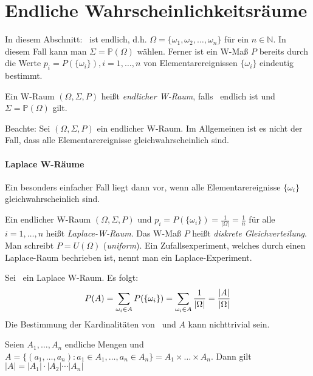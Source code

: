 \section{Endliche Wahrscheinlichkeitsräume}
In diesem Abschnitt: \tO\ ist endlich, d.h. $\Omega = \{\omega_1, \omega_2, \dots, \omega_n\}$
für ein $n \in \mathbb{N}$.
In diesem Fall kann man $\Sigma = \mathbb{P}(\Omega)$ wählen.
Ferner ist ein W-Maß $P$ bereits durch die Werte $p_i = P(\{\omega_i\}), i=1,\dots,n$
von Elementarereignissen $\{\omega_i\}$ eindeutig bestimmt.

\begin{definition}
    Ein W-Raum $(\Omega, \Sigma,  P)$ heißt \emph{endlicher W-Raum}, falls \tO\ endlich ist und
    $\Sigma = \mathbb{P}(\Omega)$ gilt.
\end{definition}

Beachte: Sei $(\Omega, \Sigma, P)$ ein endlicher W-Raum. Im Allgemeinen ist es nicht der Fall, dass alle
Elementarereignisse gleichwahrscheinlich sind.

\paragraph{Laplace W-Räume} Ein besonders einfacher Fall liegt dann vor, wenn alle Elementarereignisse
$\{\omega_i\}$ gleichwahrscheinlich sind.

\begin{definition}
    Ein endlicher W-Raum $(\Omega, \Sigma, P)$ und $p_i = P(\{\omega_i\}) = \frac{1}{|\Omega|} = \frac{1}{n}$
    für alle $i=1,\dots,n$ heißt \emph{Laplace-W-Raum}.
    Das W-Maß $P$ heißt \emph{diskrete Gleichverteilung}.
    Man schreibt $P=U(\Omega)$ (\textit{uniform}).
    Ein Zufallsexperiment, welches durch einen Laplace-Raum bechrieben ist, nennt man ein
    Laplace-Experiment.
\end{definition}

Sei \wraum\ ein Laplace W-Raum. Es folgt:
\begin{equation*}
    P(A) = \sum_{\omega_i \in A} P(\{\omega_i\}) = \sum_{\omega_i \in A} \frac{1}{|\Omega|} = \frac{|A|}{|\Omega|}
\end{equation*}
Die Bestimmung der Kardinalitäten von \tO\ und $A$ kann nichttrivial sein.

\begin{theorem}
    Seien $A_1, \dots ,A_n$ endliche Mengen und $A= \{ (a_1, \dots , a_n): a_1 \in A_1, \dots , a_n \in A_n \} = A_1 \times \dots \times A_n$.
    Dann gilt $|A| = |A_1| \cdot |A_2| \cdots |A_n|$
\end{theorem}

